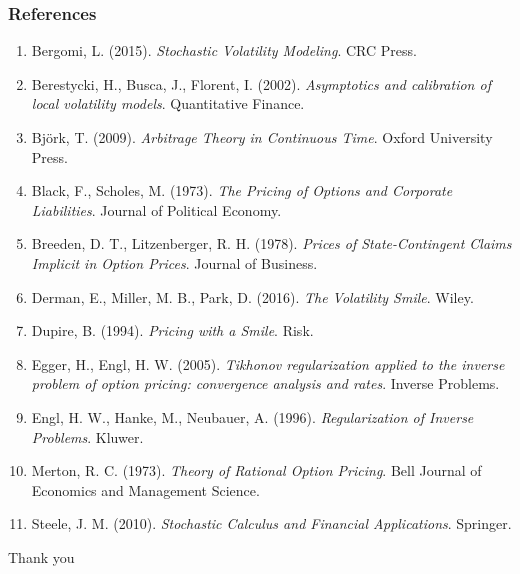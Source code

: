 \frame
{\frametitle
{References}
\scriptsize{
\begin{enumerate}
\item Bergomi, L. (2015). \emph{Stochastic Volatility Modeling}. CRC Press.
\item Berestycki, H., Busca, J., Florent, I. (2002). \emph{Asymptotics and calibration of local volatility models}. Quantitative Finance.
\item Bj\"ork, T. (2009). \emph{Arbitrage Theory in Continuous Time}. Oxford University Press.
\item Black, F., Scholes, M. (1973). \emph{The Pricing of Options and Corporate Liabilities}. Journal of Political Economy.
\item Breeden, D. T., Litzenberger, R. H. (1978). \emph{Prices of State-Contingent Claims Implicit in Option Prices}. Journal of Business.
\item Derman, E., Miller, M. B., Park, D. (2016). \emph{The Volatility Smile}. Wiley.
\item Dupire, B. (1994). \emph{Pricing with a Smile}. Risk.
\item Egger, H., Engl, H. W. (2005). \emph{Tikhonov regularization applied to the inverse problem of option pricing: convergence analysis and rates}. Inverse Problems.
\item Engl, H. W., Hanke, M., Neubauer, A. (1996). \emph{Regularization of Inverse Problems}. Kluwer.
\item Merton, R. C. (1973). \emph{Theory of Rational Option Pricing}. Bell Journal of Economics and Management Science.
\item Steele, J. M. (2010). \emph{Stochastic Calculus and Financial Applications}. Springer.
\end{enumerate}
}
}

\begin{frame}
\begin{center}
\Large Thank you
\end{center}
\end{frame}
